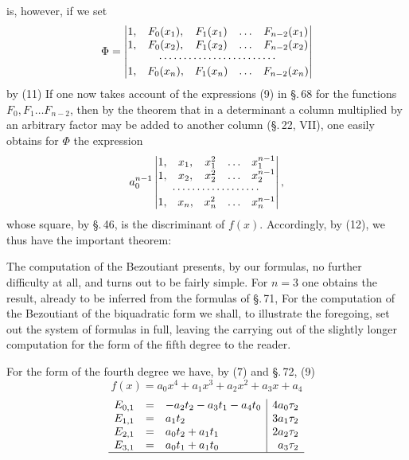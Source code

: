 is, however, if we set
\[
\Phi =
\begin{vmatrix}
1, & F_0(x_1), & F_1(x_1) & \ldots & F_{n-2}(x_1) \\
1, & F_0(x_2), & F_1(x_2) & \ldots & F_{n-2}(x_2) \\
\multicolumn{5}{c}{\cdots\cdots\cdots\cdots\cdots\cdots\cdots\cdots} \\
1, & F_0(x_n), & F_1(x_n) & \ldots & F_{n-2}(x_n)
\end{vmatrix}
\]
by (11)
If one now takes account of the expressions (9) in \S.\,68 for the functions
$F_0, F_1 \ldots F_{n-2}$, then by the theorem that in a determinant
a column multiplied by an arbitrary factor may be added to
another column (\S.\,22, VII), one easily obtains for $\Phi$ the expression
\[
a_0^{n-1}
\begin{vmatrix}
1, & x_1, & x_1^2 & \ldots & x_1^{n-1} \\
1, & x_2, & x_2^2 & \ldots & x_2^{n-1} \\
\multicolumn{5}{c}{\cdots\cdots\cdots\cdots\cdots\cdots} \\
1, & x_n, & x_n^2 & \ldots & x_n^{n-1}
\end{vmatrix},
\]
whose square, by \S.\,46, is the discriminant of $f(x)$. Accordingly,
by (12), we thus have the important theorem:


The computation of the Bezoutiant presents, by our formulas,
no further difficulty at all, and turns out to be fairly simple.
For $n = 3$ one obtains the result, already to be inferred from
the formulas of \S.\,71,
For the computation of the Bezoutiant of the biquadratic
form we shall, to illustrate the foregoing, set out the
system of formulas in full, leaving the carrying out of the
slightly longer computation for the form of the fifth degree
to the reader.

For the form of the fourth degree we have, by (7) and \S.\,72, (9)
\[
f(x) = a_0 x^4 + a_1 x^3 + a_2 x^2 + a_3 x + a_4
\]
\[
\begin{array}{rcl|r}
E_{0,1} &=& -a_2 t_2 - a_3 t_1 - a_4 t_0 & 4 a_0 \tau_2 \\
E_{1,1} &=& a_1 t_2 & 3 a_1 \tau_2 \\
E_{2,1} &=& a_0 t_2 + a_1 t_1 & 2 a_2 \tau_2 \\
E_{3,1} &=& a_0 t_1 + a_1 t_0 & a_3 \tau_2 \\
\hline
\end{array}
\]
